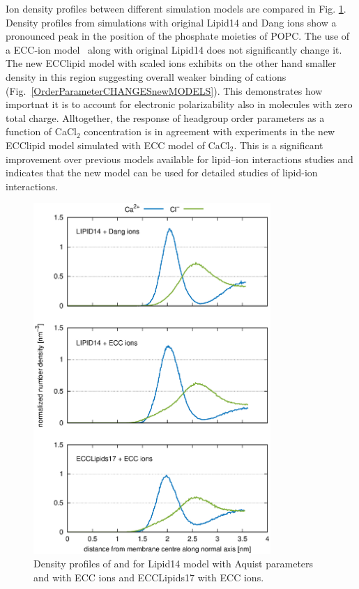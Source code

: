 \documentclass[aip,jcp,twocolumn]{revtex4}
\begin{document}
{Ion density profiles between different simulation models are compared in Fig. \ref{fig:cacl-dens}.
Density profiles from simulations with original Lipid14 and Dang ions \cite{smith94,chang1999,dang2006} show a pronounced peak in the position of the phosphate moieties of POPC. 
The use of a ECC-ion model~\cite{kohagen14,kohagen16} along with original Lipid14 does not significantly change it. 
The new ECClipid model with scaled ions exhibits on the other hand smaller density in this region suggesting overall weaker binding of cations (Fig.~\ref{OrderParameterCHANGESnewMODELS}). 
This demonstrates how importnat it is to account for electronic polarizability also in molecules with zero total charge. 
Alltogether,
the response of headgroup order parameters as a function of CaCl$_2$ concentration is in agreement with
experiments in the new ECClipid model simulated with ECC model of CaCl$_2$. This is a significant improvement
over previous models available for lipid--ion interactions studies \cite{catte16} and indicates that
the new model can be used for detailed studies of lipid-ion interactions.

\begin{figure}[]
  \centering
  \includegraphics[width=9.0cm,angle=0]{../Fig/CAdensities.eps}
  \caption{\label{fig:cacl-dens}
    Density profiles of  and  for Lipid14 model with Aquist parameters and with ECC ions and ECCLipids17 with ECC ions. }
\end{figure}


}
\end{document}
